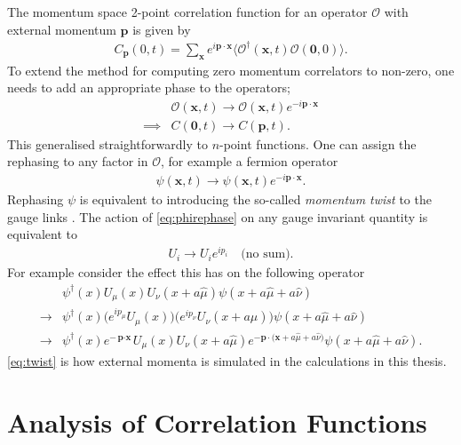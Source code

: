 The momentum space 2-point correlation function for an operator $\mathcal{O}$ with external momentum ${\textbf{p}}$ is given by
\begin{align}
  C_{\textbf{p}}(0,t) = \sum_{{\textbf{x}}} e^{i{\textbf{p}}\cdot{\textbf{x}}} \langle \mathcal{O}^{\dagger} ({\textbf{x}},t) \mathcal{O}({\textbf{0}},0) \rangle.
\end{align}
To extend the method for computing zero momentum correlators to non-zero, one needs to add an appropriate phase to the operators;
\begin{align}
  \label{eq:phirephase}
  &\mathcal{O}({\textbf{x}},t) \rightarrow \mathcal{O}({\textbf{x}},t)e^{-i{\textbf{p}}\cdot{\textbf{x}}} \\
  \implies &C({\textbf{0}},t) \rightarrow C({\textbf{p}},t).
\end{align}
This generalised straightforwardly to $n$-point functions. One can assign the rephasing to any factor in $\mathcal{O}$, for example a fermion operator
\begin{align}
  \psi({\textbf{x}},t) \rightarrow \psi({\textbf{x}},t)e^{-i{\textbf{p}}\cdot{\textbf{x}}}.
\end{align}
Rephasing $\psi$ is equivalent to introducing the so-called {\it{momentum twist}} to the gauge links \cite{Guadagnoli:2005be}. The action of \eqref{eq:phirephase} on any gauge invariant quantity is equivalent to
\begin{align}
  U_i \rightarrow U_i e^{ip_i}\quad\text{(no sum)}.
  \label{eq:twist}
\end{align}
For example consider the effect this has on the following operator
\begin{align}
  \nonumber
  &\psi^{\dagger}(x) U_{\mu}(x) U_{\nu}(x+a\hat{\mu}) \psi(x+a\hat{\mu}+a\hat{\nu}) \\
  \nonumber
  \rightarrow &\psi^{\dagger}(x) \big( e^{ip_{\mu}}U_{\mu}(x) \big) \big( e^{ip_{\nu}}U_{\nu}(x+a\hat{\mu}) \big) \psi(x+a\hat{\mu}+a\hat{\nu})
  \\
  \rightarrow &\psi^{\dagger}(x)e^{-{\textbf{p}\cdot\textbf{x}}}U_{\mu}(x) U_{\nu}(x+a\hat{\mu}) e^{-{\textbf{p}\cdot(\textbf{x}}+a\hat{\mu}+a\hat{\nu})}\psi(x+a\hat{\mu}+a\hat{\nu}).
\end{align}
\eqref{eq:twist} is how external momenta is simulated in the calculations in this thesis.

\section{Analysis of Correlation Functions}

